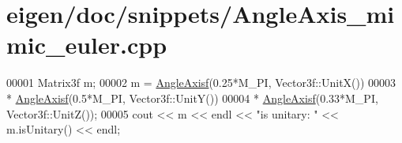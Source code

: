 \hypertarget{eigen_2doc_2snippets_2_angle_axis__mimic__euler_8cpp_source}{}\section{eigen/doc/snippets/\+Angle\+Axis\+\_\+mimic\+\_\+euler.cpp}
\label{eigen_2doc_2snippets_2_angle_axis__mimic__euler_8cpp_source}

\begin{DoxyCode}
00001 Matrix3f m;
00002 m = \hyperlink{group___geometry___module_gadc7128416da41ca99bb8af814b78599e}{AngleAxisf}(0.25*M\_PI, Vector3f::UnitX())
00003   * \hyperlink{group___geometry___module_gadc7128416da41ca99bb8af814b78599e}{AngleAxisf}(0.5*M\_PI,  Vector3f::UnitY())
00004   * \hyperlink{group___geometry___module_gadc7128416da41ca99bb8af814b78599e}{AngleAxisf}(0.33*M\_PI, Vector3f::UnitZ());
00005 cout << m << endl << \textcolor{stringliteral}{"is unitary: "} << m.isUnitary() << endl;
\end{DoxyCode}
